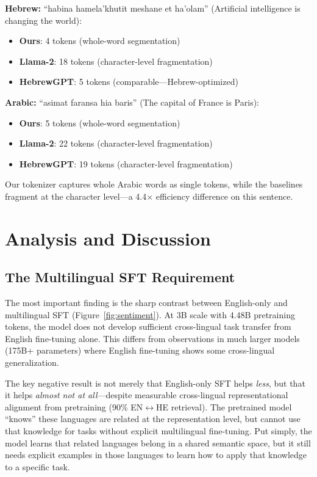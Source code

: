 \documentclass[10pt,twocolumn]{article}
\begin{document}
\textbf{Hebrew:} ``habina hamela'khutit meshane et ha'olam'' (Artificial intelligence is changing the world):
\begin{itemize}
    \item \textbf{Ours}: 4 tokens (whole-word segmentation)
    \item \textbf{Llama-2}: 18 tokens (character-level fragmentation)
    \item \textbf{HebrewGPT}: 5 tokens (comparable---Hebrew-optimized)
\end{itemize}

\textbf{Arabic:} ``asimat faransa hia baris'' (The capital of France is Paris):

\begin{itemize}
    \item \textbf{Ours}: 5 tokens (whole-word segmentation)
    \item \textbf{Llama-2}: 22 tokens (character-level fragmentation)
    \item \textbf{HebrewGPT}: 19 tokens (character-level fragmentation)
\end{itemize}

Our tokenizer captures whole Arabic words as single tokens, while the baselines fragment at the character level---a 4.4$\times$ efficiency difference on this sentence.

\section{Analysis and Discussion}

\subsection{The Multilingual SFT Requirement}

The most important finding is the sharp contrast between English-only and multilingual SFT (Figure~\ref{fig:sentiment}). At 3B scale with 4.48B pretraining tokens, the model does not develop sufficient cross-lingual task transfer from English fine-tuning alone. This differs from observations in much larger models (175B+ parameters) where English fine-tuning shows some cross-lingual generalization.

The key negative result is not merely that English-only SFT helps \emph{less}, but that it helps \emph{almost not at all}---despite measurable cross-lingual representational alignment from pretraining (90\% EN$\leftrightarrow$HE retrieval). The pretrained model ``knows'' these languages are related at the representation level, but cannot use that knowledge for tasks without explicit multilingual fine-tuning. Put simply, the model learns that related languages belong in a shared semantic space, but it still needs explicit examples in those languages to learn how to apply that knowledge to a specific task.
\end{document}
